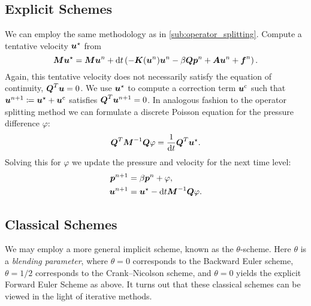 \subsection{Explicit Schemes}

We can employ the same methodology as in \cref{sub:operator_splitting}. Compute
a tentative velocity \( \boldsymbol{u}^\star \) from 
\begin{equation}
    \boldsymbol{M}\boldsymbol{u}^\star = \boldsymbol{M}\boldsymbol{u}^n + \mathrm{d} t \left( -\boldsymbol{K}(\boldsymbol{u}^n)\boldsymbol{u}^n - \beta
    \boldsymbol{Q}\boldsymbol{p}^n+ \boldsymbol{A} \boldsymbol{u}^n + \boldsymbol{f}^n\right).
\end{equation}
Again, this tentative velocity does not necessarily satisfy the equation of
continuity, \(\boldsymbol{Q}^T\boldsymbol{u} = 0\). We use \( \boldsymbol{u}^\star \) to compute a correction
term \( \boldsymbol{u}^\mathrm{c} \) such that \( \boldsymbol{u}^{n+1} \coloneqq \boldsymbol{u}^\star +
\boldsymbol{u}^\mathrm{c} \) satisfies \( \boldsymbol{Q}^T \boldsymbol{u}^{n+1} = 0 \). In analogous fashion
to the operator splitting method we can formulate a discrete Poisson equation
for the pressure difference \( \varphi \):
\begin{equation}
    \boldsymbol{Q}^T\boldsymbol{M}^{-1}\boldsymbol{Q}\varphi = \frac{1}{\mathrm{d} t} \boldsymbol{Q}^T\boldsymbol{u}^\star.
\end{equation}
Solving this for \( \varphi \) we update the pressure and velocity for the next
time level:
\begin{align}
    \boldsymbol{p}^{n+1} &= \beta \boldsymbol{p}^n  + \varphi, \\
    \boldsymbol{u}^{n+1} &= \boldsymbol{u}^\star - \mathrm{d} t \boldsymbol{M}^{-1}\boldsymbol{Q}\varphi.
\end{align}

\subsection{Classical Schemes}
\label{sub:classical_schemes}

We may employ a more general implicit scheme, known as the \(\theta\)-scheme.
Here \( \theta \) is a \emph{blending parameter}, where \( \theta = 0 \)
corresponds to the Backward Euler scheme, \( \theta = 1/2 \) corresponds to the
Crank--Nicolson scheme, and \( \theta = 0\) yields the explicit Forward Euler
Scheme as above. It turns out that these classical schemes can be viewed in the
light of iterative methods. 


